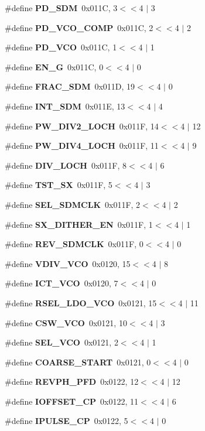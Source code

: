 \begin{DoxyCompactItemize}
\#define {\bf P\+D\+\_\+\+S\+DM}~0x011\+C, 3$<$$<$4 $\vert$  3
\item 
\#define {\bf P\+D\+\_\+\+V\+C\+O\+\_\+\+C\+O\+MP}~0x011\+C, 2$<$$<$4 $\vert$  2
\item 
\#define {\bf P\+D\+\_\+\+V\+CO}~0x011\+C, 1$<$$<$4 $\vert$  1
\item 
\#define {\bf E\+N\+\_\+G}~0x011\+C, 0$<$$<$4 $\vert$  0
\item 
\#define {\bf F\+R\+A\+C\+\_\+\+S\+DM}~0x011\+D, 19$<$$<$4 $\vert$  0
\item 
\#define {\bf I\+N\+T\+\_\+\+S\+DM}~0x011\+E, 13$<$$<$4 $\vert$  4
\item 
\#define {\bf P\+W\+\_\+\+D\+I\+V2\+\_\+\+L\+O\+CH}~0x011\+F, 14$<$$<$4 $\vert$  12
\item 
\#define {\bf P\+W\+\_\+\+D\+I\+V4\+\_\+\+L\+O\+CH}~0x011\+F, 11$<$$<$4 $\vert$  9
\item 
\#define {\bf D\+I\+V\+\_\+\+L\+O\+CH}~0x011\+F, 8$<$$<$4 $\vert$  6
\item 
\#define {\bf T\+S\+T\+\_\+\+SX}~0x011\+F, 5$<$$<$4 $\vert$  3
\item 
\#define {\bf S\+E\+L\+\_\+\+S\+D\+M\+C\+LK}~0x011\+F, 2$<$$<$4 $\vert$  2
\item 
\#define {\bf S\+X\+\_\+\+D\+I\+T\+H\+E\+R\+\_\+\+EN}~0x011\+F, 1$<$$<$4 $\vert$  1
\item 
\#define {\bf R\+E\+V\+\_\+\+S\+D\+M\+C\+LK}~0x011\+F, 0$<$$<$4 $\vert$  0
\item 
\#define {\bf V\+D\+I\+V\+\_\+\+V\+CO}~0x0120, 15$<$$<$4 $\vert$  8
\item 
\#define {\bf I\+C\+T\+\_\+\+V\+CO}~0x0120, 7$<$$<$4 $\vert$  0
\item 
\#define {\bf R\+S\+E\+L\+\_\+\+L\+D\+O\+\_\+\+V\+CO}~0x0121, 15$<$$<$4 $\vert$  11
\item 
\#define {\bf C\+S\+W\+\_\+\+V\+CO}~0x0121, 10$<$$<$4 $\vert$  3
\item 
\#define {\bf S\+E\+L\+\_\+\+V\+CO}~0x0121, 2$<$$<$4 $\vert$  1
\item 
\#define {\bf C\+O\+A\+R\+S\+E\+\_\+\+S\+T\+A\+RT}~0x0121, 0$<$$<$4 $\vert$  0
\item 
\#define {\bf R\+E\+V\+P\+H\+\_\+\+P\+FD}~0x0122, 12$<$$<$4 $\vert$  12
\item 
\#define {\bf I\+O\+F\+F\+S\+E\+T\+\_\+\+CP}~0x0122, 11$<$$<$4 $\vert$  6
\item 
\#define {\bf I\+P\+U\+L\+S\+E\+\_\+\+CP}~0x0122, 5$<$$<$4 $\vert$  0
\item 

\end{DoxyCompactItemize}
